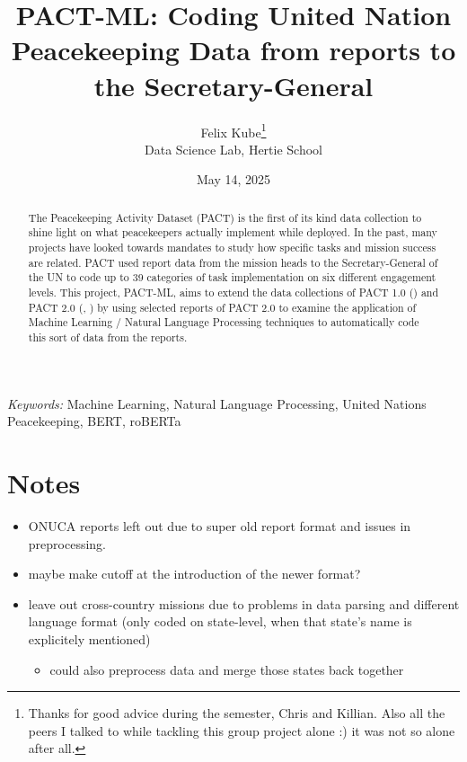 \documentclass[
  12pt]{article}
\providecommand{\tightlist}{%
  \setlength{\itemsep}{0pt}\setlength{\parskip}{0pt}}\usepackage{longtable,booktabs,array}
\begin{document}
\def\spacingset#1{\renewcommand{\baselinestretch}%
{#1}\small\normalsize} \spacingset{1}



\date{May 14, 2025}
\title{\bf PACT-ML: Coding United Nation Peacekeeping Data from reports
to the Secretary-General}
\author{
Felix Kube\thanks{Thanks for good advice during the semester, Chris and
Killian. Also all the peers I talked to while tackling this group
project alone :) it was not so alone after all.}\\
Data Science Lab, Hertie School\\
}
\maketitle

\bigskip
\bigskip
\begin{abstract}
The Peacekeeping Activity Dataset (PACT) is the first of its kind data
collection to shine light on what peacekeepers actually implement while
deployed. In the past, many projects have looked towards mandates to
study how specific tasks and mission success are related. PACT used
report data from the mission heads to the Secretary-General of the UN to
code up to 39 categories of task implementation on six different
engagement levels. This project, PACT-ML, aims to extend the data
collections of PACT 1.0 (\citet{Blair2022}) and PACT 2.0 (\citet{PACT2},
\citet{Otto2024}) by using selected reports of PACT 2.0 to examine the
application of Machine Learning / Natural Language Processing techniques
to automatically code this sort of data from the reports.
\end{abstract}

\noindent%
{\it Keywords:} Machine Learning, Natural Language Processing, United
Nations Peacekeeping, BERT, roBERTa
\vfill

\newpage
\spacingset{1.9} %

\section{Notes}\label{notes}

\begin{itemize}
\tightlist
\item
  ONUCA reports left out due to super old report format and issues in
  preprocessing.
\item
  maybe make cutoff at the introduction of the newer format?
\item
  leave out cross-country missions due to problems in data parsing and
  different language format (only coded on state-level, when that
  state's name is explicitely mentioned)

  \begin{itemize}
  \tightlist
  \item
    could also preprocess data and merge those states back together
  \end{itemize}
\end{itemize}
\end{document}

